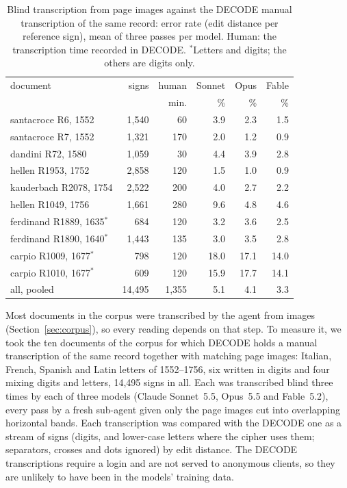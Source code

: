 \documentclass[11pt]{article}
\begin{document}
\begin{table}[t]
\centering\small
\begin{tabular}{@{}lrrrrr@{}}
\toprule
document & signs & human & Sonnet & Opus & Fable \\
 & & min. & \% & \% & \% \\
\midrule
santacroce R6, 1552 & 1,540 & 60 & 3.9 & 2.3 & 1.5 \\
santacroce R7, 1552 & 1,321 & 170 & 2.0 & 1.2 & 0.9 \\
dandini R72, 1580 & 1,059 & 30 & 4.4 & 3.9 & 2.8 \\
hellen R1953, 1752 & 2,858 & 120 & 1.5 & 1.0 & 0.9 \\
kauderbach R2078, 1754 & 2,522 & 200 & 4.0 & 2.7 & 2.2 \\
hellen R1049, 1756 & 1,661 & 280 & 9.6 & 4.8 & 4.6 \\
\midrule
ferdinand R1889, 1635$^*$ & 684 & 120 & 3.2 & 3.6 & 2.5 \\
ferdinand R1890, 1640$^*$ & 1,443 & 135 & 3.0 & 3.5 & 2.8 \\
carpio R1009, 1677$^*$ & 798 & 120 & 18.0 & 17.1 & 14.0 \\
carpio R1010, 1677$^*$ & 609 & 120 & 15.9 & 17.7 & 14.1 \\
\midrule
all, pooled & 14,495 & 1,355 & 5.1 & 4.1 & 3.3 \\
\bottomrule
\end{tabular}
\caption{\label{tab:transcription} Blind transcription from page images against the DECODE manual transcription of the same record: error rate (edit distance per reference sign), mean of three passes per model. Human: the transcription time recorded in DECODE. $^*$Letters and digits; the others are digits only.}
\end{table}

Most documents in the corpus were transcribed by the agent from images (Section~\ref{sec:corpus}), so every reading depends on that step. To measure it, we took the ten documents of the corpus for which DECODE holds a manual transcription of the same record together with matching page images: Italian, French, Spanish and Latin letters of 1552--1756, six written in digits and four mixing digits and letters, 14,495 signs in all. Each was transcribed blind three times by each of three models (Claude Sonnet~5.5, Opus~5.5 and Fable~5.2), every pass by a fresh sub-agent given only the page images cut into overlapping horizontal bands. Each transcription was compared with the DECODE one as a stream of signs (digits, and lower-case letters where the cipher uses them; separators, crosses and dots ignored) by edit distance. The DECODE transcriptions require a login and are not served to anonymous clients, so they are unlikely to have been in the models' training data.
\end{document}
